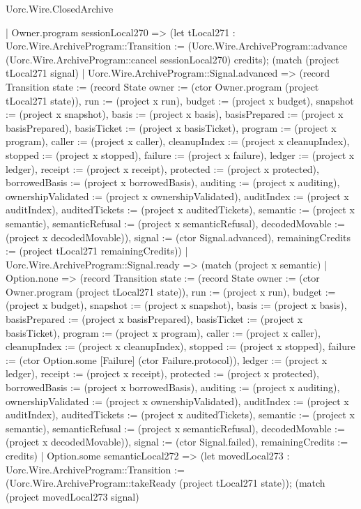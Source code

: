 \begin{lexlean}{Uorc.Wire.ClosedArchive}
\begin{semanticmodule}
{    | Owner.program sessionLocal270 => (let tLocal271 : Uorc.Wire.ArchiveProgram::Transition := (Uorc.Wire.ArchiveProgram::advance (Uorc.Wire.ArchiveProgram::cancel sessionLocal270) credits); (match (project tLocal271 signal)
      | Uorc.Wire.ArchiveProgram::Signal.advanced => (record Transition {state := (record State {owner := (ctor Owner.program (project tLocal271 state)), run := (project x run), budget := (project x budget), snapshot := (project x snapshot), basis := (project x basis), basisPrepared := (project x basisPrepared), basisTicket := (project x basisTicket), program := (project x program), caller := (project x caller), cleanupIndex := (project x cleanupIndex), stopped := (project x stopped), failure := (project x failure), ledger := (project x ledger), receipt := (project x receipt), protected := (project x protected), borrowedBasis := (project x borrowedBasis), auditing := (project x auditing), ownershipValidated := (project x ownershipValidated), auditIndex := (project x auditIndex), auditedTickets := (project x auditedTickets), semantic := (project x semantic), semanticRefusal := (project x semanticRefusal), decodedMovable := (project x decodedMovable)}), signal := (ctor Signal.advanced), remainingCredits := (project tLocal271 remainingCredits)})
      | Uorc.Wire.ArchiveProgram::Signal.ready => (match (project x semantic)
        | Option.none => (record Transition {state := (record State {owner := (ctor Owner.program (project tLocal271 state)), run := (project x run), budget := (project x budget), snapshot := (project x snapshot), basis := (project x basis), basisPrepared := (project x basisPrepared), basisTicket := (project x basisTicket), program := (project x program), caller := (project x caller), cleanupIndex := (project x cleanupIndex), stopped := (project x stopped), failure := (ctor Option.some [Failure] (ctor Failure.protocol)), ledger := (project x ledger), receipt := (project x receipt), protected := (project x protected), borrowedBasis := (project x borrowedBasis), auditing := (project x auditing), ownershipValidated := (project x ownershipValidated), auditIndex := (project x auditIndex), auditedTickets := (project x auditedTickets), semantic := (project x semantic), semanticRefusal := (project x semanticRefusal), decodedMovable := (project x decodedMovable)}), signal := (ctor Signal.failed), remainingCredits := credits})
        | Option.some semanticLocal272 => (let movedLocal273 : Uorc.Wire.ArchiveProgram::Transition := (Uorc.Wire.ArchiveProgram::takeReady (project tLocal271 state)); (match (project movedLocal273 signal)
}
\end{semanticmodule}
\end{lexlean}
